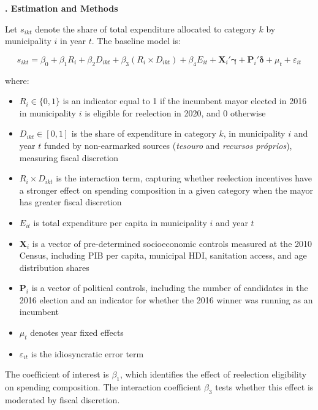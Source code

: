 \documentclass[12pt, a4paper]{article}
\newcounter{headercounter}
\newcommand{\header}[1]{\begin{center}{\large \textbf{\Roman{headercounter}. #1}} \end{center} \stepcounter{headercounter}}
\begin{document}
\header{Estimation and Methods}

Let $s_{ikt}$ denote the share of total expenditure allocated to category $k$ by municipality $i$ in year $t$. The baseline model is:

\begin{equation}
    s_{ikt} = \beta_0 
            + \beta_1 R_i 
            + \beta_2 D_{ikt} 
            + \beta_3 (R_i \times D_{ikt}) 
            + \beta_4 E_{it} 
            + \mathbf{X}_i'\boldsymbol{\gamma} 
            + \mathbf{P}_i'\boldsymbol{\delta} 
            + \mu_t 
            + \varepsilon_{it}
\end{equation}

\noindent where:

\begin{itemize}
    \item $R_i \in \{0,1\}$ is an indicator equal to 1 if the incumbent mayor elected in 2016 in municipality $i$ is eligible for reelection in 2020, and 0 otherwise
    \item $D_{ikt} \in [0,1]$ is the share of expenditure in category $k$, in municipality $i$ and year $t$ funded by non-earmarked sources (\textit{tesouro} and \textit{recursos próprios}), measuring fiscal discretion
    \item $R_i \times D_{ikt}$ is the interaction term, capturing whether reelection incentives have a stronger effect on spending composition in a given category when the mayor has greater fiscal discretion
    \item $E_{it}$ is total expenditure per capita in municipality $i$ and year $t$
    \item $\mathbf{X}_i$ is a vector of pre-determined socioeconomic controls measured at the 2010 Census, including PIB per capita, municipal HDI, sanitation access, and age distribution shares
    \item $\mathbf{P}_i$ is a vector of political controls, including the number of candidates in the 2016 election and an indicator for whether the 2016 winner was running as an incumbent
    \item $\mu_t$ denotes year fixed effects
    \item $\varepsilon_{it}$ is the idiosyncratic error term
\end{itemize}

\noindent The coefficient of interest is $\beta_1$, which identifies the effect of reelection eligibility on spending composition. The interaction coefficient $\beta_3$ tests whether this effect is moderated by fiscal discretion.
\end{document}
